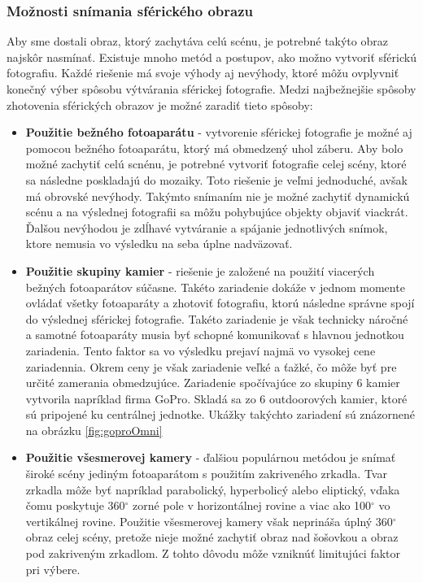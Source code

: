 \documentclass[slovak,master,dept460,male,cpp,cpdeclaration]{diploma}
\begin{document}
\subsubsection*{Možnosti snímania sférického obrazu}
Aby  sme dostali obraz, ktorý zachytáva celú scénu, je potrebné takýto obraz najskôr nasmínať. Existuje mnoho metód a postupov, ako možno vytvoriť sférickú fotografiu. Každé riešenie má svoje výhody aj nevýhody, ktoré môžu ovplyvniť konečný výber spôsobu výtvárania sférickej fotografie. Medzi najbežnejšie spôsoby zhotovenia sférických obrazov je možné zaradiť tieto spôsoby:
\begin{itemize}
\item \textbf{Použitie bežného fotoaparátu} - vytvorenie sférickej fotografie je možné aj pomocou  bežného fotoaparátu, ktorý má obmedzený uhol záberu. Aby bolo možné zachytiť celú scnénu, je potrebné  vytvoriť fotografie celej scény, ktoré sa následne poskladajú  do mozaiky. Toto riešenie je veľmi jednoduché, avšak má  obrovské nevýhody. Takýmto  snímaním nie je možné zachytiť dynamickú scénu a na výslednej fotografii sa môžu pohybujúce objekty objaviť viackrát. Ďalšou nevýhodou je zdĺhavé vytváranie a spájanie jednotlivých snímok, ktore nemusia vo výsledku  na seba úplne nadväzovať.

\item \textbf{Použitie skupiny kamier} - riešenie je založené na použití viacerých bežných fotoaparátov súčasne. Takéto zariadenie dokáže v jednom momente ovládať všetky fotoaparáty a zhotoviť fotografiu, ktorú následne správne spojí do výslednej sférickej fotografie. Takéto zariadenie je však technicky náročné a samotné fotoaparáty musia byť schopné komunikovať s hlavnou jednotkou zariadenia. Tento faktor sa vo výsledku prejaví najmä vo vysokej cene zariadennia. Okrem ceny  je však zariadenie veľké a ťažké, čo môže byť pre určité zamerania obmedzujúce. Zariadenie spočívajúce zo skupiny 6 kamier vytvorila napríklad firma GoPro. Skladá sa zo 6 outdoorových kamier, ktoré sú pripojené ku centrálnej jednotke. Ukážky takýchto zariadení sú znázornené na obrázku \ref{fig:goproOmni}

\item \textbf{Použitie všesmerovej kamery} - ďalšiou populárnou metódou je snímať široké scény jediným fotoaparátom s použitím zakriveného zrkadla. Tvar zrkadla môže byť napríklad parabolický, hyperbolicý alebo eliptický, vďaka čomu  poskytuje 360$ ^\circ$ zorné pole v horizontálnej rovine a viac ako 100$^\circ$ vo vertikálnej rovine. Použitie všesmerovej kamery však neprináša  úplný 360$ ^\circ$  obraz celej scény, pretože nieje možné zachytiť  obraz nad šošovkou a obraz pod zakriveným zrkadlom. Z tohto dôvodu môže vzniknúť limitujúci faktor pri výbere.  


\end{itemize}
\end{document}
